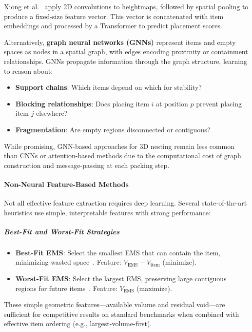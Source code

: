 Xiong et al.~\cite{XGP24} apply 2D convolutions to heightmaps, followed by spatial pooling to produce a fixed-size feature vector. This vector is concatenated with item embeddings and processed by a Transformer to predict placement scores.

Alternatively, \textbf{graph neural networks (GNNs)} represent items and empty spaces as nodes in a spatial graph, with edges encoding proximity or containment relationships. GNNs propagate information through the graph structure, learning to reason about:

\begin{itemize}
    \item \textbf{Support chains}: Which items depend on which for stability?
    \item \textbf{Blocking relationships}: Does placing item $i$ at position $p$ prevent placing item $j$ elsewhere?
    \item \textbf{Fragmentation}: Are empty regions disconnected or contiguous?
\end{itemize}

While promising, GNN-based approaches for 3D nesting remain less common than CNNs or attention-based methods due to the computational cost of graph construction and message-passing at each packing step.


\paragraph{Non-Neural Feature-Based Methods}

Not all effective feature extraction requires deep learning. Several state-of-the-art heuristics use simple, interpretable features with strong performance:

\subparagraph{Best-Fit and Worst-Fit Strategies}

\begin{itemize}
    \item \textbf{Best-Fit EMS}: Select the smallest EMS that can contain the item, minimizing wasted space~\cite{PAVTO08}. Feature: $V_{\text{EMS}} - V_{\text{item}}$ (minimize).
    \item \textbf{Worst-Fit EMS}: Select the largest EMS, preserving large contiguous regions for future items~\cite{FB10}. Feature: $V_{\text{EMS}}$ (maximize).
\end{itemize}

These simple geometric features---available volume and residual void---are sufficient for competitive results on standard benchmarks when combined with effective item ordering (e.g., largest-volume-first).

